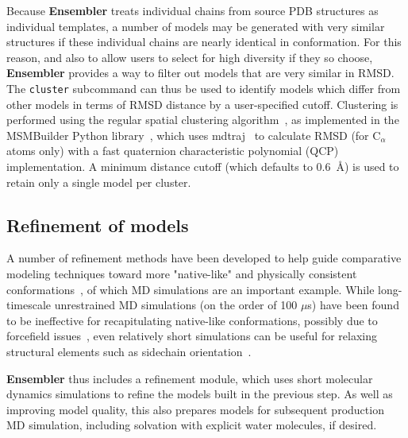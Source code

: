 \documentclass[aps,pre,twocolumn,nofootinbib,superscriptaddress,linenumbers]{revtex4-1}
\begin{document}
Because {\bf Ensembler} treats individual chains from source PDB structures as individual templates, a number of models may be generated with very similar structures if these individual chains are nearly identical in conformation.
For this reason, and also to allow users to select for high diversity if they so choose, {\bf Ensembler} provides a way to filter out models that are very similar in RMSD.
The {\tt cluster} subcommand can thus be used to identify models which differ from other models in terms of RMSD distance by a user-specified cutoff.
Clustering is performed using the regular spatial clustering algorithm~\cite{noe:jcp:2011:msm-review}, as implemented in the MSMBuilder Python library~\cite{msmbuilder}, which uses mdtraj~\cite{mdtraj} to calculate RMSD (for C$_\alpha$ atoms only) with a fast quaternion characteristic polynomial (QCP)~\cite{theobald:acta-cryst-a:2005:qcp,theobald:j-comput-chem:2010:qcp,theobald:j-comput-chem:2011:qcp} implementation.
A minimum distance cutoff (which defaults to 0.6~\AA) is used to retain only a single model per cluster.

\subsection{Refinement of models}

A number of refinement methods have been developed to help guide comparative modeling techniques toward more "native-like" and physically consistent conformations~\cite{maccallum:prot:2011:casp-refinement,zhang:curr-opin-struct-biol:2009:structure-prediction}, of which MD simulations are an important example.
While long-timescale unrestrained MD simulations (on the order of 100 $\mu$s) have been found to be ineffective for recapitulating native-like conformations, possibly due to forcefield issues~\cite{raval:prot:2012:long-timescale-md-refinement}, even relatively short simulations can be useful for relaxing structural elements such as sidechain orientation~\cite{zhang:curr-opin-struct-biol:2009:structure-prediction}.

{\bf Ensembler} thus includes a refinement module, which uses short molecular dynamics simulations to refine the models built in the previous step.
As well as improving model quality, this also prepares models for subsequent production MD simulation, including solvation with explicit water molecules, if desired.
\end{document}
